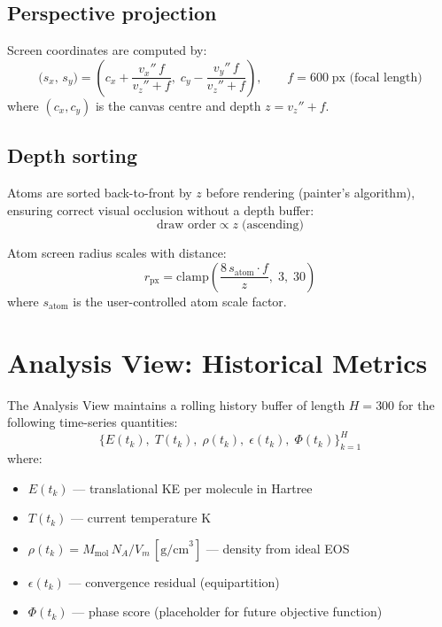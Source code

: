 ﻿\documentclass[11pt]{article}
\begin{document}
\subsection{Perspective projection}

Screen coordinates are computed by:
\begin{equation}
  \bigl(s_x,\,s_y\bigr) =
  \left(
    c_x + \frac{v_x''\,f}{v_z'' + f},\;
    c_y - \frac{v_y''\,f}{v_z'' + f}
  \right),
  \qquad f = 600\;\text{px (focal length)}
\end{equation}
where $(c_x, c_y)$ is the canvas centre and depth $z = v_z'' + f$.

\subsection{Depth sorting}

Atoms are sorted back-to-front by $z$ before rendering (painter's algorithm),
ensuring correct visual occlusion without a depth buffer:
\begin{equation}
  \text{draw order} \propto z \;\text{(ascending)}
\end{equation}

Atom screen radius scales with distance:
\begin{equation}
  r_\mathrm{px} = \mathrm{clamp}\!\left(\frac{8\,s_\mathrm{atom} \cdot f}{z},\;3,\;30\right)
\end{equation}
where $s_\mathrm{atom}$ is the user-controlled atom scale factor.

\section{Analysis View: Historical Metrics}
\label{sec:history}

The Analysis View maintains a rolling history buffer of length $H = 300$ for
the following time-series quantities:
\begin{equation}
  \bigl\{E(t_k),\;T(t_k),\;\rho(t_k),\;\epsilon(t_k),\;\Phi(t_k)\bigr\}_{k=1}^{H}
\end{equation}
where:
\begin{itemize}[noitemsep]
  \item $E(t_k)$ --- translational KE per molecule in Hartree
  \item $T(t_k)$ --- current temperature K
  \item $\rho(t_k) = M_\mathrm{mol}\,N_A / V_m\,[\text{g/cm}^3]$ --- density from ideal EOS
  \item $\epsilon(t_k)$ --- convergence residual (equipartition)
  \item $\Phi(t_k)$ --- phase score (placeholder for future objective function)
\end{itemize}
\end{document}
